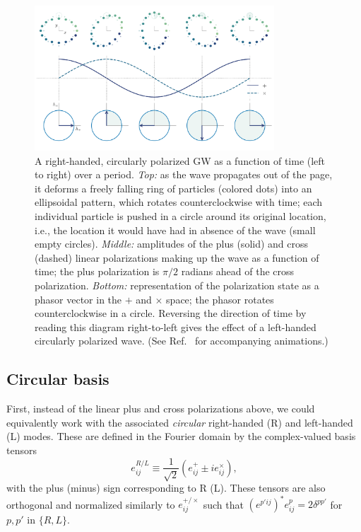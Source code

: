\documentclass[aps,prd,twocolumn,superscriptaddress,preprintnumbers,floatfix,nofootinbib]{revtex4-2}
\newcommand{\beq}{\begin{equation}}
\newcommand{\eeq}{\end{equation}}
\begin{document}
\begin{figure}
\includegraphics[width=0.8\textwidth]{pol_diagram_circ}
\caption{A right-handed, circularly polarized GW as a function of time (left to right) over a period. \emph{Top:} as the wave propagates out of the page, it deforms a freely falling ring of particles (colored dots) into an ellipsoidal pattern, which rotates counterclockwise with time; each individual particle is pushed in a circle around its original location, i.e., the location it would have had in absence of the wave (small empty circles).
\emph{Middle:} amplitudes of the plus (solid) and cross (dashed) linear polarizations making up the wave as a function of time; the plus polarization is $\pi/2$ radians ahead of the cross polarization.
\emph{Bottom:} representation of the polarization state as a phasor vector in the $+$ and $\times$ space; the phasor rotates counterclockwise in a circle.
Reversing the direction of time by reading this diagram right-to-left gives the effect of a left-handed circularly polarized wave.
(See Ref.~\cite{release} for accompanying animations.)
}
\label{fig:pol_diagram_circ}
\end{figure}

\subsection{Circular basis}

First, instead of the linear plus and cross polarizations above, we could equivalently work with the associated \emph{circular} right-handed (R) and left-handed (L) modes.
These are defined in the Fourier domain by the complex-valued basis tensors
\beq \label{eq:circ}
e^{R/L}_{ij} \equiv \frac{1}{\sqrt{2}} \left(e^+_{ij} \pm i e^\times_{ij} \right) ,
\eeq
with the plus (minus) sign corresponding to R (L).
These tensors are also orthogonal and normalized similarly to $e^{+/\times}_{ij}$ such that $(e^{p'ij})^* e^p_{ij} = 2 \delta^{pp'}$ for $p,p'$ in $\{R,L\}$.
\end{document}
